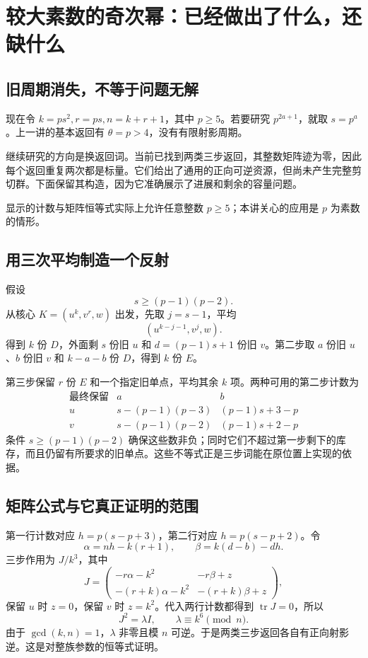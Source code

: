 \chapter{较大素数的奇次幂：已经做出了什么，还缺什么}\label{ch:high}
\section{旧周期消失，不等于问题无解}
现在令 $k=ps^2,r=ps,n=k+r+1$，其中 $p\ge5$。若要研究 $p^{2a+1}$，就取 $s=p^a$。上一讲的基本返回有 $\theta=p>4$，没有有限射影周期。

继续研究的方向是换返回词。当前已找到两类三步返回，其整数矩阵迹为零，因此每个返回重复两次都是标量。它们给出了通用的正向可逆资源，但尚未产生完整剪切群。下面保留其构造，因为它准确展示了进展和剩余的容量问题。

显示的计数与矩阵恒等式实际上允许任意整数 $p\ge5$；本讲关心的应用是 $p$ 为素数的情形。

\section{用三次平均制造一个反射}
假设
\[s\ge(p-1)(p-2).
\]
从核心 $K=(u^k,v^r,w)$ 出发，先取 $j=s-1$，平均
\[(u^{k-j-1},v^j,w).
\]
得到 $k$ 份 $D$，外面剩 $s$ 份旧 $u$ 和 $d=(p-1)s+1$ 份旧 $v$。第二步取 $a$ 份旧 $u$、$b$ 份旧 $v$ 和 $k-a-b$ 份 $D$，得到 $k$ 份 $E$。

第三步保留 $r$ 份 $E$ 和一个指定旧单点，平均其余 $k$ 项。两种可用的第二步计数为
\[
\begin{array}{c|cc}
\text{最终保留}&a&b\\\hline
u&s-(p-1)(p-3)&(p-1)s+3-p\\
v&s-(p-1)(p-2)&(p-1)s+2-p
\end{array}
\]
条件 $s\ge(p-1)(p-2)$ 确保这些数非负；同时它们不超过第一步剩下的库存，而且仍留有所要求的旧单点。这些不等式正是三步词能在原位置上实现的依据。

\section{矩阵公式与它真正证明的范围}
第一行计数对应 $h=p(s-p+3)$，第二行对应 $h=p(s-p+2)$。令
\[\alpha=nh-k(r+1),\qquad\beta=k(d-b)-dh.
\]
三步作用为 $J/k^3$，其中
\[
J=\begin{pmatrix}
-r\alpha-k^2&-r\beta+z\\
-(r+k)\alpha-k^2&-(r+k)\beta+z
\end{pmatrix},
\]
保留 $u$ 时 $z=0$，保留 $v$ 时 $z=k^2$。代入两行计数都得到 $\operatorname{tr}J=0$，所以
\[J^2=\lambda I,\qquad \lambda\equiv k^6\pmod n.
\]
由于 $\gcd(k,n)=1$，$\lambda$ 非零且模 $n$ 可逆。于是两类三步返回各自有正向射影逆。这是对整族参数的恒等式证明。

